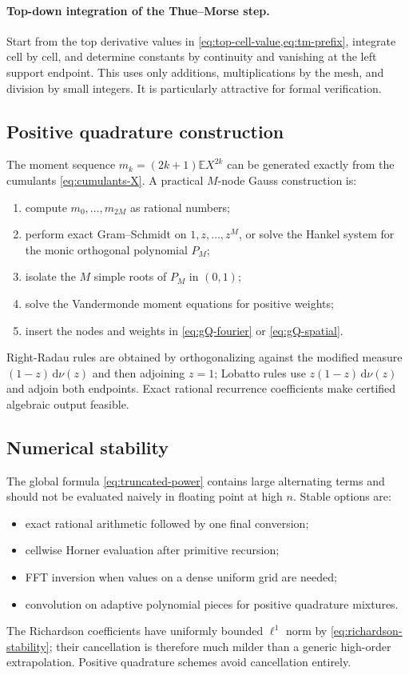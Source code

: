 \documentclass[11pt]{article}
\theoremstyle{definition}
\theoremstyle{remark}
\newcommand{\E}{\mathbb E}
\newcommand{\dd}{\,\mathrm d}
\begin{document}
\paragraph{Top-down integration of the Thue--Morse step.}
Start from the top derivative values in \cref{eq:top-cell-value,eq:tm-prefix}, integrate
cell by cell, and determine constants by continuity and vanishing at the left support
endpoint.  This uses only additions, multiplications by the mesh, and division by small
integers.  It is particularly attractive for formal verification.

\subsection{Positive quadrature construction}

The moment sequence $m_k=(2k+1)\E X^{2k}$ can be generated exactly from the cumulants
\cref{eq:cumulants-X}.  A practical $M$-node Gauss construction is:
\begin{enumerate}[leftmargin=2.1em]
\item compute $m_0,\ldots,m_{2M}$ as rational numbers;
\item perform exact Gram--Schmidt on $1,z,\ldots,z^M$, or solve the Hankel system for
      the monic orthogonal polynomial $P_M$;
\item isolate the $M$ simple roots of $P_M$ in $(0,1)$;
\item solve the Vandermonde moment equations for positive weights;
\item insert the nodes and weights in \cref{eq:gQ-fourier} or
      \cref{eq:gQ-spatial}.
\end{enumerate}
Right-Radau rules are obtained by orthogonalizing against the modified measure
$(1-z)\dd\nu(z)$ and then adjoining $z=1$; Lobatto rules use
$z(1-z)\dd\nu(z)$ and adjoin both endpoints.  Exact rational recurrence coefficients
make certified algebraic output feasible.

\subsection{Numerical stability}

The global formula \cref{eq:truncated-power} contains large alternating terms and should
not be evaluated naively in floating point at high $n$.  Stable options are:
\begin{itemize}[leftmargin=2em]
\item exact rational arithmetic followed by one final conversion;
\item cellwise Horner evaluation after primitive recursion;
\item FFT inversion when values on a dense uniform grid are needed;
\item convolution on adaptive polynomial pieces for positive quadrature mixtures.
\end{itemize}
The Richardson coefficients have uniformly bounded $\ell^1$ norm by
\cref{eq:richardson-stability}; their cancellation is therefore much milder than a
generic high-order extrapolation.  Positive quadrature schemes avoid cancellation
entirely.
\end{document}
